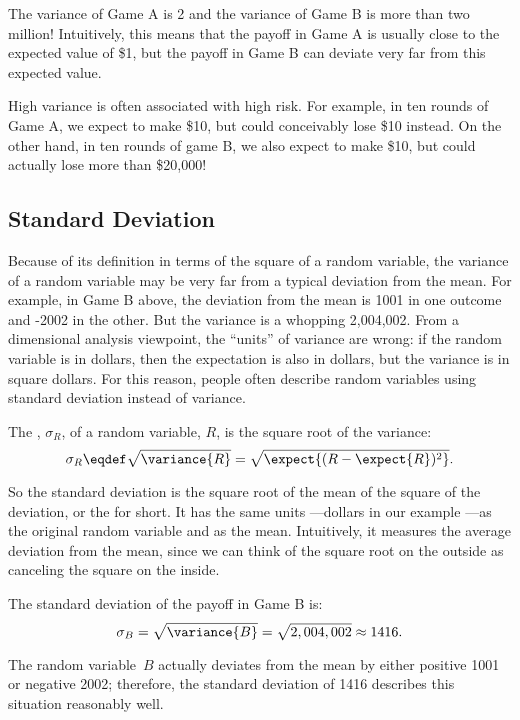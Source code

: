 The variance of Game A is 2 and the variance of Game B is more than
two million!  Intuitively, this means that the payoff in Game A is
usually close to the expected value of \$1, but the payoff in Game B
can deviate very far from this expected value.

High variance is often associated with high risk.  For example, in ten
rounds of Game A, we expect to make \$10, but could conceivably lose
\$10  instead.  On the other hand, in ten rounds of game B, we also
expect to make \$10, but could actually lose more than \$20,000!

\subsection{Standard Deviation}

Because of its definition in terms of the square of a random variable, the
variance of a random variable may be very far from a typical deviation
from the mean.  For example, in Game B above, the deviation from the mean
is 1001 in one outcome and -2002 in the other. But the variance is a
whopping 2,004,002.  From a dimensional analysis viewpoint, the ``units''
of variance are wrong: if the random variable is in dollars, then the
expectation is also in dollars, but the variance is in square dollars.
For this reason, people often describe random variables using standard
deviation instead of variance.

\begin{definition}
The , $\sigma_R$, of a random variable, $R$, is
the square root of the variance:
\[
\sigma_R \eqdef \sqrt{\variance{R}} = \sqrt{\expect{(R - \expect{R})^2}}.
\]      
\end{definition}

So the standard deviation is the square root of the mean of the square of
the deviation, or the  for short.  It has the same
units ---dollars in our example ---as the original random variable and as
the mean.  Intuitively, it measures the average deviation from the mean,
since we can think of the square root on the outside as canceling the
square on the inside.

\begin{example}
The standard deviation of the payoff in Game B is:
\[
    \sigma_B  = \sqrt{\variance{B}} = \sqrt{2,004,002} \approx 1416.
\]

The random variable~$B$ actually deviates from the mean by either
positive 1001  or negative 2002; therefore, the standard
deviation of 1416 describes this situation reasonably well.
\end{example}


